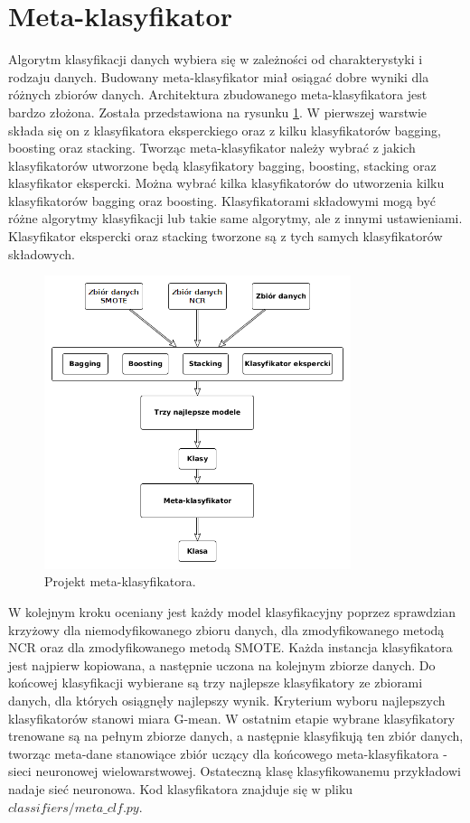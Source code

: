 \section{Meta-klasyfikator}
Algorytm klasyfikacji danych wybiera się w zależności od charakterystyki i rodzaju danych. Budowany meta-klasyfikator miał osiągać dobre wyniki dla różnych zbiorów danych. Architektura zbudowanego meta-klasyfikatora jest bardzo złożona. Została przedstawiona na rysunku \ref{fig:metaklasmoj}. W pierwszej warstwie składa się on z klasyfikatora eksperckiego oraz z kilku klasyfikatorów bagging, boosting oraz stacking. Tworząc meta-klasyfikator należy wybrać z jakich klasyfikatorów utworzone będą klasyfikatory bagging, boosting, stacking oraz klasyfikator ekspercki. Można wybrać kilka klasyfikatorów do utworzenia kilku klasyfikatorów bagging oraz boosting. Klasyfikatorami składowymi mogą być różne algorytmy klasyfikacji lub takie same algorytmy, ale z innymi ustawieniami. Klasyfikator ekspercki oraz stacking tworzone są z tych samych klasyfikatorów składowych. 
\begin{figure}[H]
	\centering
	\includegraphics[width=0.8\textwidth]{./images/metaklas.png}
	\caption{Projekt meta-klasyfikatora.}
	\label{fig:metaklasmoj}
\end{figure}W kolejnym kroku oceniany jest każdy model klasyfikacyjny poprzez sprawdzian krzyżowy dla niemodyfikowanego zbioru danych, dla zmodyfikowanego metodą NCR oraz dla zmodyfikowanego metodą SMOTE. Każda instancja klasyfikatora jest najpierw kopiowana, a następnie uczona na kolejnym zbiorze danych. Do końcowej klasyfikacji wybierane są trzy najlepsze klasyfikatory ze zbiorami danych, dla których osiągnęły najlepszy wynik. Kryterium wyboru najlepszych klasyfikatorów stanowi miara G-mean. W ostatnim etapie wybrane klasyfikatory trenowane są na pełnym zbiorze danych, a następnie klasyfikują ten zbiór danych, tworząc meta-dane stanowiące zbiór uczący dla końcowego meta-klasyfikatora - sieci neuronowej wielowarstwowej. Ostateczną klasę klasyfikowanemu przykładowi nadaje sieć neuronowa. Kod klasyfikatora znajduje się w pliku $classifiers/meta\_clf.py$.

